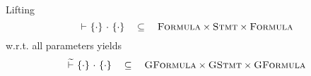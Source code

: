 Lifting 
$${~} \,\,{\vdash}\,\, \{{\cdot}\} ~{\cdot}~ \{{\cdot}\} ~~~\subseteq~~~ \textup{\textsc{Formula}} \times \textup{\textsc{Stmt}} \times \textup{\textsc{Formula}}$$
w.r.t. all parameters yields
$${~} \,\,\widetilde{\vdash}\,\, \{{\cdot}\} ~{\cdot}~ \{{\cdot}\} ~~~\subseteq~~~ \textup{\textsc{GFormula}} \times \textup{\textsc{GStmt}} \times \textup{\textsc{GFormula}}$$

\begin{comment}
It is worth noting that optimality of $\gthoare {~} {\cdot} {\cdot} {\cdot}$ is not required and in practice even potentially contra-productive in the light of decidability.
Consider the example:
Optimality discussion:
\begin{verbatim}
{i = 10000}
n = collatzIterations(300, i);
{1 <= n * n <= 4}
{n = 4}
staticAssert (n = 4);
{n = 4}
\end{verbatim}
...not verifiable with optimal lifting!
\end{comment}






